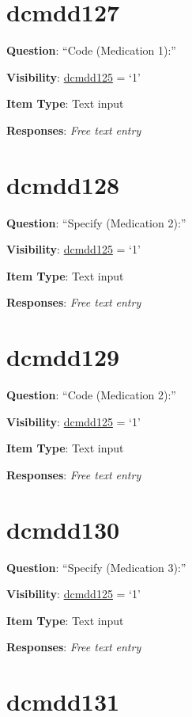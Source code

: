 \documentclass[]{book}
\begin{document}
\hypertarget{dcmdd127}{%
\section{dcmdd127}\label{dcmdd127}}

\textbf{Question}: ``Code (Medication 1):''

\textbf{Visibility}: \protect\hyperlink{dcmdd125}{dcmdd125} = `1'

\textbf{Item Type}: Text input

\textbf{Responses}: \emph{Free text entry}

\hypertarget{dcmdd128}{%
\section{dcmdd128}\label{dcmdd128}}

\textbf{Question}: ``Specify (Medication 2):''

\textbf{Visibility}: \protect\hyperlink{dcmdd125}{dcmdd125} = `1'

\textbf{Item Type}: Text input

\textbf{Responses}: \emph{Free text entry}

\hypertarget{dcmdd129}{%
\section{dcmdd129}\label{dcmdd129}}

\textbf{Question}: ``Code (Medication 2):''

\textbf{Visibility}: \protect\hyperlink{dcmdd125}{dcmdd125} = `1'

\textbf{Item Type}: Text input

\textbf{Responses}: \emph{Free text entry}

\hypertarget{dcmdd130}{%
\section{dcmdd130}\label{dcmdd130}}

\textbf{Question}: ``Specify (Medication 3):''

\textbf{Visibility}: \protect\hyperlink{dcmdd125}{dcmdd125} = `1'

\textbf{Item Type}: Text input

\textbf{Responses}: \emph{Free text entry}

\hypertarget{dcmdd131}{%
\section{dcmdd131}\label{dcmdd131}}
\end{document}
